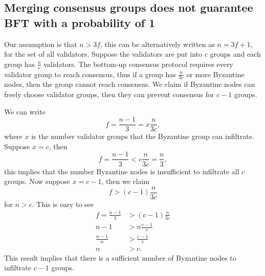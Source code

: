 \subsection{Merging consensus groups does not guarantee BFT with a probability
  of 1}
Our assumption is that $n > 3f$, this can be alternatively written as $n = 3f +
1$, for the set of all validators. Suppose the validators are put into $c$
groups and each group has $\frac{n}{c}$ validators. The bottom-up consensus
protocol requires every validator group to reach consensus, thus if a group has
$\frac{n}{3c}$ or more Byzantine nodes, then the group cannot reach consensus.
We claim if Byzantine nodes can freely choose validator groups, then they can
prevent consensus for $c-1$ groups.

We can write
$$
f = \frac{n-1}{3} = x \frac{n}{3c},
$$
where $x$ is the number validator groups that the Byzantine group can
infiltrate. Suppose $x = c$, then
$$f = \frac{n-1}{3} < c \frac{n}{3c} = \frac{n}{3},$$
this implies that the number Byzantine nodes is insufficient to infiltrate all
$c$ groups. Now suppose $x = c - 1$, then we claim
$$f > (c-1) \frac{n}{3c}$$
for $n > c$. This is easy to see
\begin{align*}
  f = \frac{n-1}{3} &> (c-1)\frac{n}{3c} \\
  n - 1 &> n\frac{c-1}{c} \\
  \frac{n-1}{n} &> \frac{c-1}{c} \\
  n &> c.
\end{align*}
This result implies that there is a sufficient number of Byzantine nodes to
infiltrate $c - 1$ groups.

